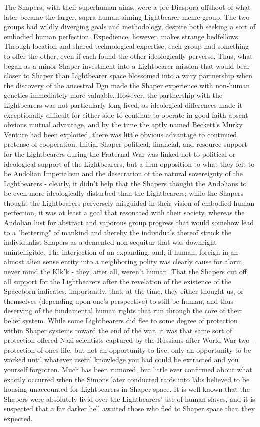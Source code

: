 The Shapers, with their superhuman aims, were a pre-Diaspora offshoot
of what later became the larger, supra-human aiming Lightbearer
meme-group. The two groups had wildly diverging goals and methodology,
despite both seeking a sort of embodied human perfection. Expedience,
however, makes strange bedfellows. Through location and shared
technological expertise, each group had something to offer the other,
even if each found the other ideologically perverse. Thus, what began
as a minor Shaper investment into a Lightbearer mission that would
bear closer to Shaper than Lightbearer space blossomed into a wary
partnership when the discovery of the ancestral Dgn made the Shaper
experience with non-human genetics immediately more valuable. However,
the partnership with the Lightbearers was not particularly long-lived,
as ideological differences made it exceptionally difficult for either
side to continue to operate in good faith absent obvious mutual
advantage, and by the time the aptly named Beckett's Murky Venture had
been exploited, there was little obvious advantage to continued
pretense of cooperation. Initial Shaper political, financial, and
resource support for the Lightbearers during the Fraternal War was
linked not to political or ideological support of the Lightbearers,
but a firm opposition to what they felt to be Andolian Imperialism and
the desecration of the natural sovereignty of the Lightbearers -
clearly, it didn't help that the Shapers thought the Andolians to be
even more ideologically disturbed than the Lightbearers; while the
Shapers thought the Lightbearers perversely misguided in their vision
of embodied human perfection, it was at least a goal that resonated
with their society, whereas the Andolian lust for abstract and
vaporous group progress that would somehow lead to a "bettering" of
mankind and thereby the individuals thereof struck the individualist
Shapers as a demented non-sequitur that was downright
unintelligible. The interjection of an expanding, and, if human,
foreign in an almost alien sense entity into a neighboring polity was
clearly cause for alarm, never mind the Klk'k - they, after all,
weren't human. That the Shapers cut off all support for the
Lightbearers after the revelation of the existence of the Spaceborn
indicates, importantly, that, at the time, they either thought us, or
themselves (depending upon one's perspective) to still be human, and
thus deserving of the fundamental human rights that run through the
core of their belief system. While some Lightbearers did flee to some
degree of protection within Shaper systems toward the end of the war,
it was that same sort of protection offered Nazi scientists captured
by the Russians after World War two - protection of ones life, but not
an opportunity to live, only an opportunity to be worked until
whatever useful knowledge you had could be extracted and you yourself
forgotten. Much has been rumored, but little ever confirmed about what
exactly occurred when the Simons later conducted raids into labs
believed to be housing unaccounted for Lightbearers in Shaper
space. It is well known that the Shapers were absolutely livid over
the Lightbearers' use of human slaves, and it is suspected that a far
darker hell awaited those who fled to Shaper space than they expected.

